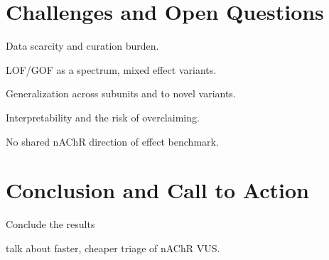 \documentclass{ws-procs11x85}
\begin{document}
\section{Challenges and Open Questions}\label{sec:challenges}
\begin{itemlist}
\item Data scarcity and curation burden.
\item LOF/GOF as a spectrum, mixed effect variants.
\item Generalization across subunits and to novel variants.
\item Interpretability and the risk of overclaiming.
\item No shared nAChR direction of effect benchmark.
\end{itemlist}

\section{Conclusion and Call to Action}\label{sec:conclusion}
\begin{itemlist}
\item Conclude the results
\item talk about faster, cheaper triage of nAChR VUS.
\end{itemlist}
\end{document}
